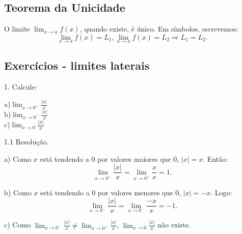 \documentclass{article}
\begin{document}
{\begin{newpage}
\subsection{Teorema da Unicidade}
\par\hspace{12pt} O limite $\displaystyle{\lim_{x\to a} f(x)}$, quando existe, é único. Em símbolos, escrevemos:
\begin{equation*} \displaystyle{\lim_{x\to a} f(x)} = L_1 , \displaystyle{\lim_{x\to a} f(x)} = L_2 \Rightarrow L_1 = L_2. \end{equation*}
\par
\subsection{Exercícios - limites laterais}
\begin{flushleft}
1. Calcule:
\end{flushleft}
\par
\begin{multicols}{3}
a)$\displaystyle{\lim_{x\to 0^{+}} \frac{|x|}{x}}$\\
b)$\displaystyle{\lim_{x\to 0^{-}} \frac{|x|}{x}}$\\
c)$\displaystyle{\lim_{x\to 0} \frac{|x|}{x}}$
\end{multicols}
\par
\vspace{0.3cm}
\begin{flushleft}
1.1 Resolução.
\end{flushleft}
\par
a) Como $x$ está tendendo a $0$ por valores maiores que $0$, $|x| = x$. Então:   \begin{equation*} \displaystyle{\lim_{x\to 0^{+}}} \frac{|x|}{x} =  \displaystyle{\lim_{x\to 0^{+}}} \frac{x}{x} = 1.\end{equation*}
\par
\vspace{0.3cm}
b) Como $x$ está tendendo a $0$ por valores menores que $0$, $|x|=-x$. Logo:
\begin{equation*} \displaystyle{\lim_{x\to 0^{-}}} \frac{|x|}{x} = \displaystyle{\lim_{x\to 0^{-}}} \frac{-x}{x} = -1.\end{equation*}
\par
\vspace{0.3cm}
c) Como $\displaystyle{\lim_{x\to 0^{-}}} \frac{|x|}{x} \neq \displaystyle{\lim_{x\to 0^{+}}} \frac{|x|}{x}$, $\displaystyle{\lim_{x\to 0}} \frac{|x|}{x}$ não existe.

\end{newpage}}
\end{document}

